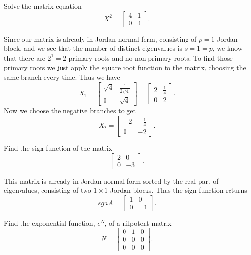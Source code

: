 \documentclass{article}
\begin{document}
\begin{problem}
  Solve the matrix equation
  \[X^2 = \begin{bmatrix} 4 & 1\\ 0 & 4 \end{bmatrix}.\]
\end{problem}

\begin{solution}
  Since our matrix is already in Jordan normal form, consisting of $p = 1$ Jordan block, and we see that the number of distinct eigenvalues is $s = 1 = p$, we know that there are $2^1 = 2$ primary roots and no non primary roots.
  To find those primary roots we just apply the square root function to the matrix, choosing the same branch every time.
  Thus we have
  \[X_1 = \begin{bmatrix} \sqrt{4} & \frac{1}{2 \sqrt{4}}\\ 0 & \sqrt{4} \end{bmatrix} = \begin{bmatrix} 2 & \frac{1}{4}\\ 0 & 2 \end{bmatrix}.\]
  Now we choose the negative branches to get
  \[X_2 = \begin{bmatrix} -2 & - \frac{1}{4}\\ 0 & -2 \end{bmatrix}.\]
\end{solution}

\begin{problem}
  Find the sign function of the matrix
  \[\begin{bmatrix} 2 & 0\\ 0 & -3 \end{bmatrix}.\]
\end{problem}

\begin{solution}
  This matrix is already in Jordan normal form sorted by the real part of eigenvalues, consisting of two $1 \times 1$ Jordan blocks.
  Thus the sign function returns
  \[sgn A = \begin{bmatrix} 1 & 0\\ 0 & -1 \end{bmatrix}.\]
\end{solution}

\begin{problem}
  Find the exponential function, $e^N$, of a nilpotent matrix
  \[N = \begin{bmatrix} 0 & 1 & 0\\ 0 & 0 & 0\\ 0 & 0 & 0 \end{bmatrix}.\]
\end{problem}
\end{document}
